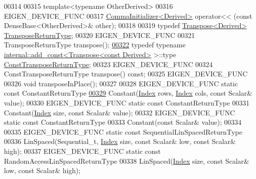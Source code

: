 \begin{DoxyCode}
00314 
00315     \textcolor{keyword}{template}<\textcolor{keyword}{typename} OtherDerived>
00316     EIGEN\_DEVICE\_FUNC
00317     \hyperlink{group___core___module_struct_eigen_1_1_comma_initializer}{CommaInitializer<Derived>} operator<< (const DenseBase<OtherDerived>& other);
00318 
00319     \textcolor{keyword}{typedef} \hyperlink{group___core___module_class_eigen_1_1_transpose}{Transpose<Derived>} \hyperlink{group___core___module_class_eigen_1_1_transpose}{TransposeReturnType};
00320     EIGEN\_DEVICE\_FUNC
00321     TransposeReturnType transpose();
\hyperlink{group___core___module_af60fcba2704ae771c148de156cf2c96b}{00322}     \textcolor{keyword}{typedef} \textcolor{keyword}{typename} \hyperlink{struct_eigen_1_1internal_1_1add__const}{internal::add\_const<Transpose<const Derived>}
       >::type \hyperlink{group___core___module_class_eigen_1_1_transpose}{ConstTransposeReturnType};
00323     EIGEN\_DEVICE\_FUNC
00324     ConstTransposeReturnType transpose() \textcolor{keyword}{const};
00325     EIGEN\_DEVICE\_FUNC
00326     \textcolor{keywordtype}{void} transposeInPlace();
00327 
00328     EIGEN\_DEVICE\_FUNC \textcolor{keyword}{static} \textcolor{keyword}{const} ConstantReturnType
\hyperlink{group___core___module_a43d80e43aca655ed92009030f8d34976}{00329}     Constant(\hyperlink{namespace_eigen_a62e77e0933482dafde8fe197d9a2cfde}{Index} rows, \hyperlink{namespace_eigen_a62e77e0933482dafde8fe197d9a2cfde}{Index} cols, \textcolor{keyword}{const} Scalar& value);
00330     EIGEN\_DEVICE\_FUNC \textcolor{keyword}{static} \textcolor{keyword}{const} ConstantReturnType
00331     Constant(\hyperlink{namespace_eigen_a62e77e0933482dafde8fe197d9a2cfde}{Index} size, \textcolor{keyword}{const} Scalar& value);
00332     EIGEN\_DEVICE\_FUNC \textcolor{keyword}{static} \textcolor{keyword}{const} ConstantReturnType
00333     Constant(\textcolor{keyword}{const} Scalar& value);
00334 
00335     EIGEN\_DEVICE\_FUNC \textcolor{keyword}{static} \textcolor{keyword}{const} SequentialLinSpacedReturnType
00336     LinSpaced(Sequential\_t, \hyperlink{namespace_eigen_a62e77e0933482dafde8fe197d9a2cfde}{Index} size, \textcolor{keyword}{const} Scalar& low, \textcolor{keyword}{const} Scalar& high);
00337     EIGEN\_DEVICE\_FUNC \textcolor{keyword}{static} \textcolor{keyword}{const} RandomAccessLinSpacedReturnType
00338     LinSpaced(\hyperlink{namespace_eigen_a62e77e0933482dafde8fe197d9a2cfde}{Index} size, \textcolor{keyword}{const} Scalar& low, \textcolor{keyword}{const} Scalar& high);

\end{DoxyCode}
